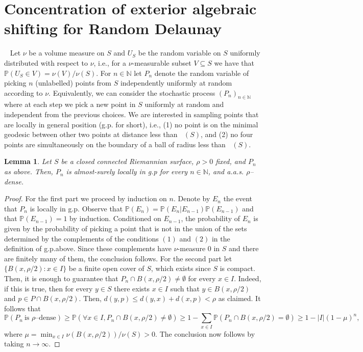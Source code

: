 \documentclass[11pt]{article}
\newtheorem{lemma}[theorem]{Lemma}
\numberwithin{claimcounter}{theorem}
\theoremstyle{remark}
\theoremstyle{definition}
\numberwithin{theorem}{section}
\newcommand{\N}{\mathbb{N}}
\renewcommand{\P}{\mathbb{P}}
\DeclareMathOperator{\rdel}{r_{Del}}
\begin{document}
\section{Concentration of exterior algebraic shifting for Random Delaunay}~\label{sec:assDelaunay}
Let $\nu$ be a volume measure on $S$ and $U_S$ be the random variable on $S$ uniformly distributed with respect to $\nu$, i.e., for a $\nu$-measurable subset $V\subseteq S$ we have that $\P(U_S\in V)=\nu(V)/\nu(S)$. For $n\in \N$ let $P_n$ denote the random variable of picking $n$ (unlabelled) points from $S$ independently uniformly at random according to $\nu$. Equivalently, we can consider the stochastic process $(P_n)_{n\in \N}$ where at each step we pick a new point in $S$ uniformly at random and independent from the previous choices. We are interested in sampling points that are locally in general position (g.p. for short), i.e., (1) no point is on the minimal geodesic between other two points at distance less
than $\rdel(S)$, and (2) no four points are simultaneously on the boundary of a ball of radius less than $\rdel(S)$.
\begin{lemma}
  \label{l:genericdense}
  Let $S$ be a closed connected Riemannian surface, $\rho>0$ fixed, and $P_n$ as above. Then,  
   $P_n$ is almost-surely locally in g.p for every $n\in \mathbb N$, and a.a.s. $\rho$--dense.
\end{lemma}
\begin{proof}
  For the first part we proceed by induction on $n$. Denote by $E_n$ the event that $P_n$ is locally in g.p. Observe that $\P(E_n)=\P(E_n|E_{n-1})\P(E_{n-1})$ and that $\P(E_{n-1})=1$ by induction. Conditioned on $E_{n-1}$, the probability of $E_n$ is given by the probability of picking a point that is not in the union of the sets determined by the complements of the conditions $(1)$ and $(2)$ in the definition of g.p.above. Since these complements have $\nu$-measure $0$ in $S$ and there are finitely many of them, the conclusion follows.
%
  For the second part let $\{B(x,\rho/2)\colon x\in I\}$ be a finite open cover of $S$, which exists since $S$ is compact. Then, it is enough to guarantee that $P_n\cap B(x,\rho/2)\neq \emptyset$ for every $x\in I$. Indeed, if this is true, then for every $y\in S$ there exists $x\in I$ such that $y\in B(x,\rho/2)$ and $p\in P\cap B(x,\rho/2)$. Then, $d(y,p)\leq d(y,x)+d(x,p)<\rho$ as claimed. It follows that
  $$\P(P_n~\text{is $\rho$--dense}) \geq \P(\forall x\in I, P_n\cap B(x,\rho/2)\neq \emptyset) \geq 1 - \sum_{x\in I}\P(P_n\cap B(x,\rho/2)=\emptyset) 
                         \geq 1-|I|(1-\mu)^n,
  $$
  where 
  $ \mu = \min_{x\in I} \nu(B(x,\rho/2))/\nu(S)>0$. 
  The conclusion now follows by taking $n\to \infty$.
\end{proof}
\end{document}

